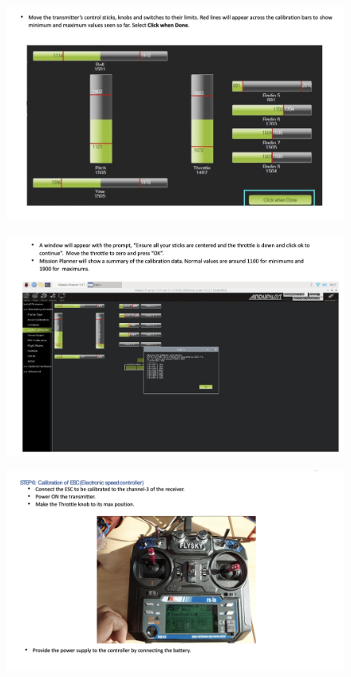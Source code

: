 \begin{figure}[h!]
\centering
\includegraphics[width=\columnwidth]{./Figures/config_img37.png}
\end{figure}

\begin{figure}[h!]
\centering
\includegraphics[width=\columnwidth]{./Figures/config_img38.png}
\end{figure}

\begin{figure}[h!]
\centering
\includegraphics[width=\columnwidth]{./Figures/config_img39.png}
\end{figure}

